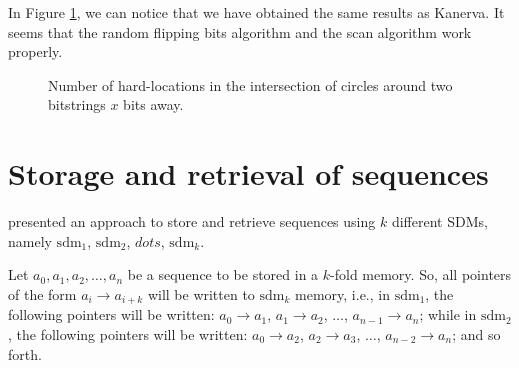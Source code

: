 In Figure \ref{fig:validation-intersection}, we can notice that we have obtained the same results as Kanerva. It seems that the random flipping bits algorithm and the scan algorithm work properly.

\begin{figure}[!htb]
  \centering

  \caption{Number of hard-locations in the intersection of circles around two bitstrings $x$ bits away.}
  \label{fig:validation-intersection}
\end{figure}


\section{Storage and retrieval of sequences}

\citet[Ch.8]{Kanerva1988} presented an approach to store and retrieve sequences using $k$ different SDMs, namely $\text{sdm}_1$, $\text{sdm}_2$, $dots$, $\text{sdm}_k$.

Let $a_0, a_1, a_2, \dots, a_n$ be a sequence to be stored in a $k$-fold memory. So, all pointers of the form $a_i \rightarrow a_{i+k}$ will be written to $\text{sdm}_k$ memory, i.e., in $\text{sdm}_1$, the following pointers will be written: $a_0 \rightarrow a_1$, $a_1 \rightarrow a_2$, $\dots$, $a_{n-1} \rightarrow a_n$; while in $\text{sdm}_2$, the following pointers will be written: $a_0 \rightarrow a_2$, $a_2 \rightarrow a_3$, $\dots$, $a_{n-2} \rightarrow a_n$; and so forth.

